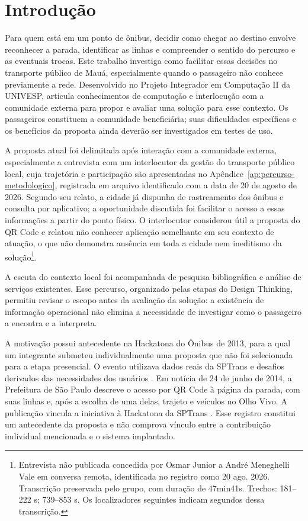 \documentclass[12pt,oneside,a4paper,brazil,chapter=TITLE]{abntex2}
\begin{document}
\textual
\OnehalfSpacing
\pagestyle{papnumeracao}
\setcounter{page}{1}
\chapter{Introdução}
Para quem está em um ponto de ônibus, decidir como chegar ao destino envolve reconhecer a parada, identificar as linhas e compreender o sentido do percurso e as eventuais trocas. Este trabalho investiga como facilitar essas decisões no transporte público de Mauá, especialmente quando o passageiro não conhece previamente a rede. Desenvolvido no Projeto Integrador em Computação II da UNIVESP, articula conhecimentos de computação e interlocução com a comunidade externa para propor e avaliar uma solução para esse contexto. Os passageiros constituem a comunidade beneficiária; suas dificuldades específicas e os benefícios da proposta ainda deverão ser investigados em testes de uso.

A proposta atual foi delimitada após interação com a comunidade externa, especialmente a entrevista com um interlocutor da gestão do transporte público local, cuja trajetória e participação são apresentadas no Apêndice~\ref{ap:percurso-metodologico}, registrada em arquivo identificado com a data de 20 de agosto de 2026. Segundo seu relato, a cidade já dispunha de rastreamento dos ônibus e consulta por aplicativo; a oportunidade discutida foi facilitar o acesso a essas informações a partir do ponto físico. O interlocutor considerou útil a proposta do QR Code e relatou não conhecer aplicação semelhante em seu contexto de atuação, o que não demonstra ausência em toda a cidade nem ineditismo da solução\footnote{Entrevista não publicada concedida por Osmar Junior a André Meneghelli Vale em conversa remota, identificada no registro como 20 ago. 2026. Transcrição preservada pelo grupo, com duração de 47min41s. Trechos: 181--222 s; 739--853 s. Os localizadores seguintes indicam segundos dessa transcrição.}.

A escuta do contexto local foi acompanhada de pesquisa bibliográfica e análise de serviços existentes. Esse percurso, organizado pelas etapas do Design Thinking, permitiu revisar o escopo antes da avaliação da solução: a existência de informação operacional não elimina a necessidade de investigar como o passageiro a encontra e a interpreta.

A motivação possui antecedente na Hackatona do Ônibus de 2013, para a qual um integrante submeteu individualmente uma proposta que não foi selecionada para a etapa presencial. O evento utilizava dados reais da SPTrans e desafios derivados das necessidades dos usuários \citep{hackatona2013}. Em notícia de 24 de junho de 2014, a Prefeitura de São Paulo descreve o acesso por QR Code à página da parada, com suas linhas e, após a escolha de uma delas, trajeto e veículos no Olho Vivo. A publicação vincula a iniciativa à Hackatona da SPTrans \citep{qrsptrans2014}. Esse registro constitui um antecedente da proposta e não comprova vínculo entre a contribuição individual mencionada e o sistema implantado.
\end{document}
